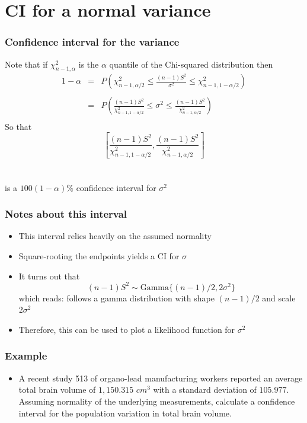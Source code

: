 \documentclass[aspectratio=169]{beamer}
\begin{document}
\section{CI for a normal variance}
\begin{frame}\frametitle{Confidence interval for the variance} 
Note that if $\chi^2_{n-1, \alpha}$ is the $\alpha$ quantile of the
Chi-squared distribution then
\begin{eqnarray*}
  1 - \alpha & = & P \left( \chi^2_{n-1, \alpha/2} \leq  \frac{(n - 1) S^2}{\sigma^2} \leq  \chi^2_{n-1,1 - \alpha/2} \right) \\ \\
& = &  P\left(\frac{(n-1)S^2}{\chi^2_{n-1,1-\alpha/2}} \leq \sigma^2 \leq 
\frac{(n-1)S^2}{\chi^2_{n-1,\alpha/2}} \right) \\
\end{eqnarray*}
So that 
$$
\left[\frac{(n-1)S^2}{\chi^2_{n-1,1-\alpha/2}}, \frac{(n-1)S^2}{\chi^2_{n-1,\alpha/2}}\right]
$$ \ \\ \ \\
is a $100(1-\alpha)\%$ confidence interval for $\sigma^2$
\end{frame}

\begin{frame}\frametitle{Notes about this interval}
\begin{itemize}
\item This interval relies heavily on the assumed normality
\item Square-rooting the endpoints yields a CI for $\sigma$
\item It turns out that  
$$
(n - 1)S^2 \sim \mbox{Gamma}\{(n-1)/2, 2\sigma^2\}
$$
which reads: follows a gamma distribution with shape $(n-1)/2$ and scale
$2\sigma^2$
\item Therefore, this can be used to plot a likelihood function for
  $\sigma^2$
\end{itemize}
\end{frame}

\begin{frame}\frametitle{Example}
\begin{itemize}
\item A recent study 513 of organo-lead manufacturing workers reported
  an average total brain volume of $1,150.315$ $cm^3$ with a standard
  deviation of $105.977$. Assuming normality of the underlying
  measurements, calculate a confidence interval for the population
  variation in total brain volume.
\end{itemize}
\end{frame}
\end{document}
